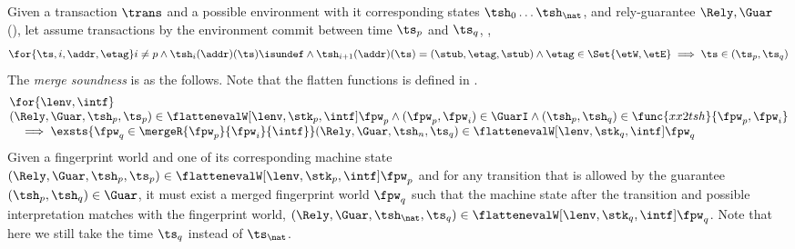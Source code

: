 \begin{lem}
\label{lem:merge-sound}
Given a transaction \( \trans \) and a possible environment with it corresponding states \( \tsh_{0} \dots \tsh_{\nat} \), and rely-guarantee \( \Rely, \Guar \) (), let assume transactions by the environment commit between time \( \ts_{p} \) and \( \ts_{q} \), \ie,
\[
    \for{\ts,i,\addr,\etag} 
    i \neq p 
    \land \tsh_{i}(\addr)(\ts)\isundef 
    \land \tsh_{i + 1}(\addr)(\ts) = (\stub, \etag, \stub) 
    \land \etag \in \Set{\etW, \etE} 
    \implies \ts \in (\ts_{p}, \ts_{q})
\]
The \emph{merge soundness} is as the follows. 
Note that the flatten functions is defined in .
\[
\begin{array}{@{}l@{}}
    \for{ \lenv, \intf}  \\
    (\Rely, \Guar, \tsh_{p}, \ts_{p}) \in \flattenevalW[\lenv, \stk_{p}, \intf]{\fpw_{p}}
    \land (\fpw_{p}, \fpw_{i} ) \in \GuarI
    \land (\tsh_{p}, \tsh_{q}) \in \func{xx2tsh}{\fpw_{p}, \fpw_{i}} \\
    \quad \implies \exsts{\fpw_{q} \in \mergeR{\fpw_{p}}{\fpw_{i}}{\intf}}
    (\Rely, \Guar, \tsh_{n}, \ts_{q}) \in \flattenevalW[\lenv, \stk_{q}, \intf]{\fpw_{q}}
\end{array}
\]
Given a fingerprint world  and one of its corresponding machine state \( (\Rely, \Guar, \tsh_{p}, \ts_{p}) \in \flattenevalW[\lenv, \stk_{p}, \intf]{\fpw_{p}} \) and for any transition that is allowed by the guarantee \( (\tsh_{p}, \tsh_{q}) \in \Guar \), it must exist a merged fingerprint world \( \fpw_{q} \) such that the machine state after the transition and possible interpretation matches with the fingerprint world, \ie \((\Rely, \Guar, \tsh_{\nat}, \ts_{q}) \in \flattenevalW[\lenv, \stk_{q}, \intf]{\fpw_{q}}\).
Note that here we still take the time \( \ts_{q} \) instead of \( \ts_{\nat} \).
\end{lem}
